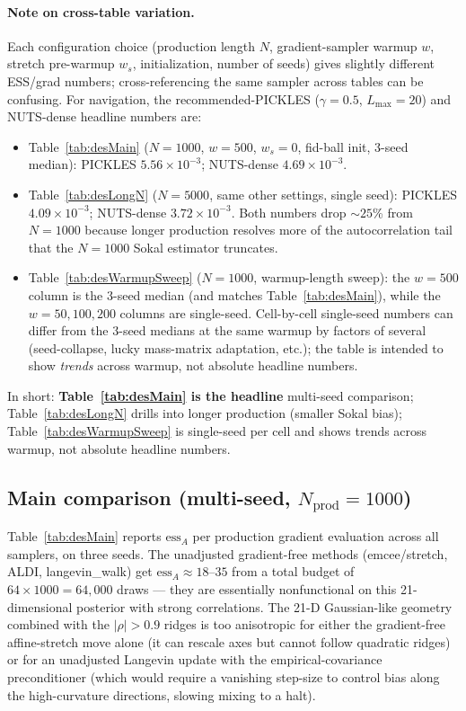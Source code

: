 \documentclass{article}
\begin{document}
\paragraph{Note on cross-table variation.}
Each configuration choice (production length $N$, gradient-sampler
warmup $w$, stretch pre-warmup $w_s$, initialization, number of seeds)
gives slightly different ESS/grad numbers; cross-referencing the same
sampler across tables can be confusing.  For navigation, the
recommended-PICKLES ($\gamma{=}0.5$, $L_{\max}{=}20$) and NUTS-dense
headline numbers are:
\begin{itemize}\setlength\itemsep{1pt}
\item Table~\ref{tab:desMain} ($N{=}1000$, $w{=}500$, $w_s{=}0$,
fid-ball init, 3-seed median): PICKLES $5.56\!\times\!10^{-3}$;
NUTS-dense $4.69\!\times\!10^{-3}$.
\item Table~\ref{tab:desLongN} ($N{=}5000$, same other settings, single
seed): PICKLES $4.09\!\times\!10^{-3}$; NUTS-dense
$3.72\!\times\!10^{-3}$.  Both numbers drop $\sim\!25$\% from $N{=}1000$
because longer production resolves more of the autocorrelation tail
that the $N{=}1000$ Sokal estimator truncates.
\item Table~\ref{tab:desWarmupSweep} ($N{=}1000$,
warmup-length sweep): the $w{=}500$ column is the $3$-seed median (and
matches Table~\ref{tab:desMain}), while the $w{=}50, 100, 200$ columns
are single-seed.  Cell-by-cell single-seed numbers can differ from the
$3$-seed medians at the same warmup by factors of several
(seed-collapse, lucky mass-matrix adaptation, etc.); the table is
intended to show \emph{trends} across warmup, not absolute headline
numbers.
\end{itemize}
In short: \textbf{Table~\ref{tab:desMain} is the headline}
multi-seed comparison; Table~\ref{tab:desLongN} drills into longer
production (smaller Sokal bias); Table~\ref{tab:desWarmupSweep} is
single-seed per cell and shows trends across warmup, not absolute
headline numbers.

\subsection{Main comparison (multi-seed, $N_{\text{prod}}=1000$)}\label{ssec:desMain}

Table~\ref{tab:desMain} reports $\mathrm{ess}_A$ per production gradient
evaluation across all samplers, on three seeds. The unadjusted
gradient-free methods (emcee/stretch, ALDI, langevin\_walk) get
$\mathrm{ess}_A\approx 18$--$35$ from a total budget of $64\times 1000=64{,}000$
draws — they are essentially nonfunctional on this 21-dimensional
posterior with strong correlations. The 21-D Gaussian-like geometry
combined with the $|\rho|>0.9$ ridges is too anisotropic for either the
gradient-free affine-stretch move alone (it can rescale axes but cannot
follow quadratic ridges) or for an unadjusted Langevin update with the
empirical-covariance preconditioner (which would require a vanishing
step-size to control bias along the high-curvature directions, slowing
mixing to a halt).
\end{document}
